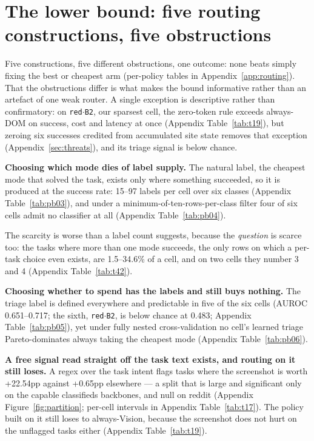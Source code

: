 \section{The lower bound: five routing constructions, five obstructions}\label{sec:lowerbound}

Five constructions, five different obstructions, one outcome: none beats simply fixing the best or cheapest arm (per-policy tables in Appendix~\ref{app:routing}). That the obstructions differ is what makes the bound informative rather than an artefact of one weak router. A single exception is descriptive rather than confirmatory: on \texttt{red$\cdot$B2}, our sparsest cell, the zero-token rule exceeds always-DOM on success, cost and latency at once (Appendix Table~\ref{tab:t19}), but zeroing six successes credited from accumulated site state removes that exception (Appendix~\ref{sec:threats}), and its triage signal is below chance.

\textbf{Choosing which mode dies of label supply.} The natural label, the cheapest mode that solved the task, exists only where something succeeded, so it is produced at the success rate: 15--97 labels per cell over six classes (Appendix Table~\ref{tab:pb03}), and under a minimum-of-ten-rows-per-class filter four of six cells admit no classifier at all (Appendix Table~\ref{tab:pb04}).

The scarcity is worse than a label count suggests, because the \emph{question} is scarce too: the tasks where more than one mode succeeds, the only rows on which a per-task choice even exists, are 1.5--34.6\% of a cell, and on two cells they number 3 and 4 (Appendix Table~\ref{tab:t42}).


\textbf{Choosing whether to spend has the labels and still buys nothing.} The triage label is defined everywhere and predictable in five of the six cells (AUROC 0.651--0.717; the sixth, \texttt{red$\cdot$B2}, is below chance at 0.483; Appendix Table~\ref{tab:pb05}), yet under fully nested cross-validation no cell's learned triage Pareto-dominates always taking the cheapest mode (Appendix Table~\ref{tab:pb06}).

\textbf{A free signal read straight off the task text exists, and routing on it still loses.} A regex over the task intent flags tasks where the screenshot is worth +22.54pp against +0.65pp elsewhere --- a split that is large and significant only on the capable classifieds backbones, and null on reddit (Appendix Figure~\ref{fig:partition}; per-cell intervals in Appendix Table~\ref{tab:t17}). The policy built on it still loses to always-Vision, because the screenshot does not hurt on the unflagged tasks either (Appendix Table~\ref{tab:t19}).


